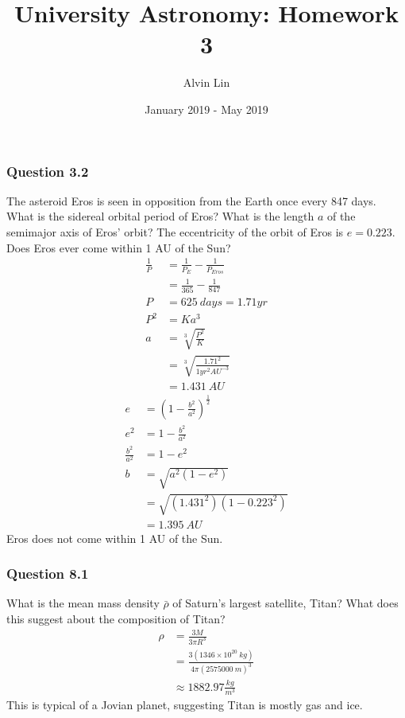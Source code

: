 \documentclass{math}
\title{University Astronomy: Homework 3}
\author{Alvin Lin}
\date{January 2019 - May 2019}
\begin{document}
\maketitle

\subsubsection*{Question 3.2}
The asteroid Eros is seen in opposition from the Earth once every 847 days. What
is the sidereal orbital period of Eros? What is the length \( a \) of the
semimajor axis of Eros' orbit? The eccentricity of the orbit of Eros is
\( e = 0.223 \). Does Eros ever come within 1 AU of the Sun?
\begin{align*}
  \frac{1}{P} &= \frac{1}{P_E}-\frac{1}{P_{Eros}} \\
  &= \frac{1}{365}-\frac{1}{847} \\
  P &= 625~days = 1.71 yr \\
  P^2 &= Ka^3 \\
  a &= \sqrt[3]{\frac{P^2}{K}} \\
  &= \sqrt[3]{\frac{1.71^2}{1yr^2AU^{-3}}} \\
  &= 1.431~AU
\end{align*}
\begin{align*}
  e &= (1-\frac{b^2}{a^2})^{\frac{1}{2}} \\
  e^2 &= 1-\frac{b^2}{a^2} \\
  \frac{b^2}{a^2} &= 1-e^2 \\
  b &= \sqrt{a^2(1-e^2)} \\
  &= \sqrt{(1.431^2)(1-0.223^2)} \\
  &= 1.395~AU
\end{align*}
Eros does not come within 1 AU of the Sun.

\subsubsection*{Question 8.1}
What is the mean mass density \( \bar{\rho} \) of Saturn's largest satellite,
Titan? What does this suggest about the composition of Titan?
\begin{align*}
  \rho &= \frac{3M}{3\pi R^3} \\
  &= \frac{3(1346\times10^{20}~kg)}{4\pi(2575000~m)^3} \\
  &\approx 1882.97\frac{kg}{m^3}
\end{align*}
This is typical of a Jovian planet, suggesting Titan is mostly gas and ice.
\end{document}

